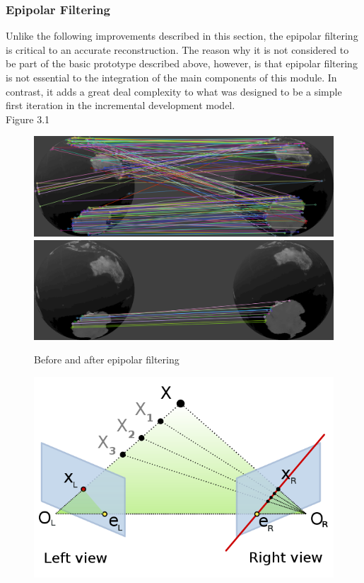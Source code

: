 \documentclass[12pt,a4paper,twoside,openright]{report}
\begin{document}
\subsubsection{Epipolar Filtering}
Unlike the following improvements described in this section, the epipolar filtering is critical to an accurate reconstruction. The reason why it is not considered to be part of the basic prototype described above, however, is that epipolar filtering is not essential to the integration of the main components of this module. In contrast, it adds a great deal complexity to what was designed to be a simple first iteration in the incremental development model.\\
\newline
Figure 3.1 
\begin{figure}
\begin{center}
\includegraphics[scale=0.35]{figs/before_epi.png} \\
\vspace{5pt}
\includegraphics[scale=0.35]{figs/after_epi.png}	
\caption{Before and after epipolar filtering}
\end{center}
\end{figure}

\begin{figure}
\begin{center}
\includegraphics[scale=0.7]{figs/Epipolar_geometry.png}
\end{center}
\end{figure}
\end{document}

